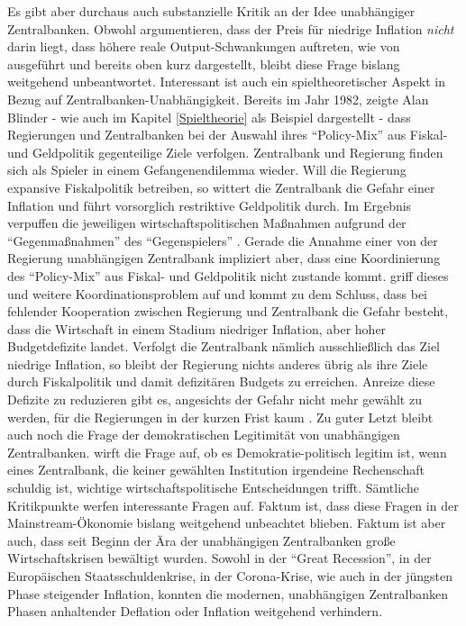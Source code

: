 Es gibt aber durchaus auch substanzielle Kritik an der Idee unabhängiger Zentralbanken. Obwohl \textcite{Alesina1995} argumentieren, dass der Preis für niedrige Inflation \textit{nicht} darin liegt, dass höhere reale Output-Schwankungen auftreten, wie von \Textcite{Rogoff1985} ausgeführt und bereits oben kurz dargestellt, bleibt diese Frage bislang weitgehend unbeantwortet. Interessant ist auch ein spieltheoretischer Aspekt in Bezug auf Zentralbanken-Unabhängigkeit. Bereits im Jahr 1982, zeigte Alan Blinder - wie auch im Kapitel \ref{Spieltheorie} als Beispiel dargestellt - dass Regierungen und Zentralbanken bei der Auswahl ihres "`Policy-Mix"' aus Fiskal- und Geldpolitik gegenteilige Ziele verfolgen. Zentralbank und Regierung finden sich als Spieler in einem Gefangenendilemma wieder. Will die Regierung expansive Fiskalpolitik betreiben, so wittert die Zentralbank die Gefahr einer Inflation und führt vorsorglich restriktive Geldpolitik durch. Im Ergebnis verpuffen die jeweiligen wirtschaftspolitischen Maßnahmen aufgrund der "`Gegenmaßnahmen"' des "`Gegenspielers"' \parencite{Blinder1982}. Gerade die Annahme einer von der Regierung unabhängigen Zentralbank impliziert aber, dass eine Koordinierung des "`Policy-Mix"' aus Fiskal- und Geldpolitik nicht zustande kommt. \textcite{Nordhaus1994} griff dieses und weitere Koordinationsproblem auf und kommt zu dem Schluss, dass bei fehlender Kooperation zwischen Regierung und Zentralbank die Gefahr besteht, dass die Wirtschaft in einem Stadium niedriger Inflation, aber hoher Budgetdefizite landet. Verfolgt die Zentralbank nämlich ausschließlich das Ziel niedrige Inflation, so bleibt der Regierung nichts anderes übrig als ihre Ziele durch Fiskalpolitik und damit defizitären Budgets zu erreichen. Anreize diese Defizite zu reduzieren gibt es, angesichts der Gefahr nicht mehr gewählt zu werden, für die Regierungen in der kurzen Frist kaum \parencite[S. 195]{Nordhaus1994}. Zu guter Letzt bleibt auch noch die Frage der demokratischen Legitimität von unabhängigen Zentralbanken. \textcite{Stiglitz1998} wirft die Frage auf, ob es Demokratie-politisch legitim ist, wenn eines Zentralbank, die keiner gewählten Institution irgendeine Rechenschaft schuldig ist, wichtige wirtschaftspolitische Entscheidungen trifft. Sämtliche Kritikpunkte werfen interessante Fragen auf. Faktum ist, dass diese Fragen in der Mainstream-Ökonomie bislang weitgehend unbeachtet blieben. Faktum ist aber auch, dass seit Beginn der Ära der unabhängigen Zentralbanken große Wirtschaftskrisen bewältigt wurden. Sowohl in der "`Great Recession"', in der Europäischen Staatsschuldenkrise, in der Corona-Krise, wie auch in der jüngsten Phase steigender Inflation, konnten die modernen, unabhängigen Zentralbanken Phasen anhaltender Deflation oder Inflation weitgehend verhindern. 

